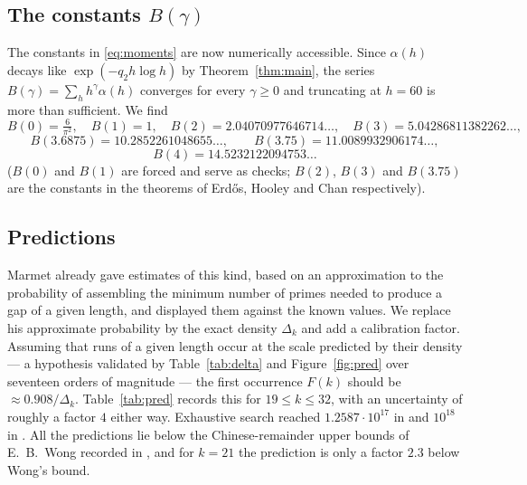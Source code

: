 \documentclass[10pt,a4paper]{amsart}
\numberwithin{equation}{section}
\begin{document}
\subsection{The constants $B(\gamma)$}
The constants in \eqref{eq:moments} are now numerically accessible. Since $\alpha(h)$
decays like $\exp(-q_2h\log h)$ by Theorem~\ref{thm:main}, the series
$B(\gamma)=\sum_hh^{\gamma}\alpha(h)$ converges for every $\gamma\ge0$ and truncating at
$h=60$ is more than sufficient. We find
\[
  B(0)=\tfrac{6}{\pi^{2}},\quad B(1)=1,\quad
  B(2)=2.04070977646714\ldots,\quad B(3)=5.04286811382262\ldots,
\]
\[
  B(3.6875)=10.2852261048655\ldots,\qquad
  B(3.75)=11.0089932906174\ldots,
\]
\[
  B(4)=14.5232122094753\ldots
\]
($B(0)$ and $B(1)$ are forced and serve as checks; $B(2)$, $B(3)$ and $B(3.75)$ are the
constants in the theorems of Erd\H{o}s, Hooley and Chan respectively).

\subsection{Predictions}\label{sub:pred}
Marmet \cite[Appendix A]{Marmet} already gave estimates of this kind, based on an
approximation to the probability of assembling the minimum number of primes needed to
produce a gap of a given length, and displayed them against the known values. We replace
his approximate probability by the exact density $\Delta_k$ and add a calibration factor.
Assuming that runs of a given length occur at the scale predicted by their density --- a
hypothesis validated by Table~\ref{tab:delta} and Figure~\ref{fig:pred} over seventeen
orders of magnitude --- the first occurrence $F(k)$ should be $\approx0.908/\Delta_k$.
Table~\ref{tab:pred} records this for $19\le k\le32$, with an uncertainty of roughly a
factor $4$ either way. Exhaustive search reached $1.2587\cdot10^{17}$ in \cite{Marmet} and
$10^{18}$ in \cite{MOT}. All the predictions lie below the Chinese-remainder upper bounds
of E.~B.~Wong recorded in \cite{Marmet}, and for $k=21$ the prediction is only a factor
$2.3$ below Wong's bound.
\end{document}
